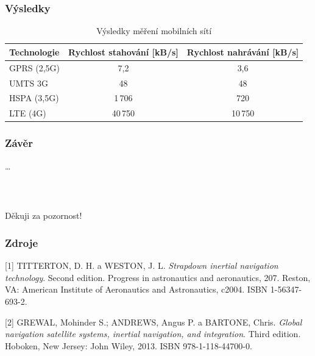 \documentclass[%
  12pt,       				%
	t,                  %
	aspectratio=1610,   %
	unicode,						%
]{beamer}				    	%
\begin{document}
\begin{frame} 
	\frametitle{Výsledky}
	\vspace{1cm}
	\begin{table}[]
		\centering
		\caption{Výsledky měření mobilních sítí}
		\label{tab:tabulka}
			\begin{tabular}{lcc}
				\toprule
					Technologie  & Rychlost stahování [kB/s] & Rychlost nahrávání [kB/s] \\
				\midrule
					GPRS (2,5G)	& 7,2 	& 3,6\\
					UMTS 3G     & 48 		& 48\\
					HSPA (3,5G)	&	1\,706	&	720\\
					LTE (4G) 		& 40\,750 & 10\,750\\
				\bottomrule                                       
			\end{tabular}
	\end{table}
\end{frame}


\begin{frame} 
	\frametitle{Závěr}
	\dots
\end{frame}


\begin{frame}[c] 
	\frametitle{\mbox{ }}
	\begin{center}
		{\Huge Děkuji za pozornost!}
	\end{center}
\end{frame}

\begin{frame}[c] 
\frametitle{Zdroje}
[1] TITTERTON, D. H. a WESTON, J. L. \textit{Strapdown inertial navigation technology}. Second edition. Progress in astronautics and aeronautics, 207. Reston, VA: American Institute of Aeronautics and Astronautics, c2004. ISBN 1-56347-693-2.

[2] GREWAL, Mohinder S.; ANDREWS, Angus P. a BARTONE, Chris. \textit{Global navigation satellite systems, inertial navigation, and integration}. Third edition. Hoboken, New Jersey: John Wiley, 2013. ISBN 978-1-118-44700-0.
\end{frame}
\end{document}
